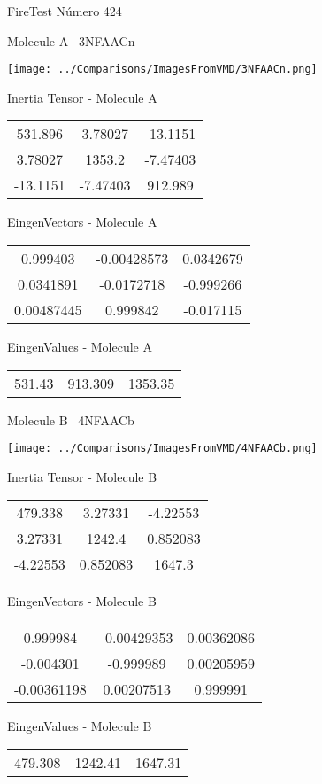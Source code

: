 \vtab[-3cm]
\begin{center}
{\large FireTest \tab Número 424}
\end{center}
\begin{multicols}{2}
\begin{center}

Molecule A \
3NFAACn

\texttt{[image: ../Comparisons/ImagesFromVMD/3NFAACn.png]}

Inertia Tensor - Molecule A \\
\begin{tabular}{|c c c|}
531.896	 & 	3.78027	 & 	-13.1151	 \\
3.78027	 & 	1353.2	 & 	-7.47403	 \\
-13.1151	 & 	-7.47403	 & 	912.989
\end{tabular}

\vtab
 EingenVectors - Molecule A     \\
\begin{tabular}{|c c c|}
0.999403	 & 	-0.00428573	 & 	0.0342679	 \\
0.0341891	 & 	-0.0172718	 & 	-0.999266	 \\
0.00487445	 & 	0.999842	 & 	-0.017115
\end{tabular}

\vtab
 EingenValues - Molecule A     \\
\begin{tabular}{|c c c|}
531.43	 & 	913.309	 & 	1353.35	 \\
\end{tabular}
\columnbreak

Molecule B \
4NFAACb

\texttt{[image: ../Comparisons/ImagesFromVMD/4NFAACb.png]}

Inertia Tensor - Molecule B \\
\begin{tabular}{|c c c|}
479.338	 & 	3.27331	 & 	-4.22553	 \\
3.27331	 & 	1242.4	 & 	0.852083	 \\
-4.22553	 & 	0.852083	 & 	1647.3
\end{tabular}

\vtab
 EingenVectors - Molecule B     \\
\begin{tabular}{|c c c|}
0.999984	 & 	-0.00429353	 & 	0.00362086	 \\
-0.004301	 & 	-0.999989	 & 	0.00205959	 \\
-0.00361198	 & 	0.00207513	 & 	0.999991
\end{tabular}

\vtab
 EingenValues - Molecule B     \\
\begin{tabular}{|c c c|}
479.308	 & 	1242.41	 & 	1647.31	 \\
\end{tabular}

\end{center}
\end{multicols}

